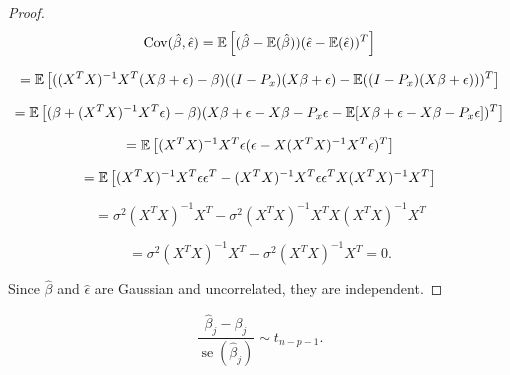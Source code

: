 \begin{proof}

\[
\mathrm{Cov}(\hat{\beta}, \hat{\epsilon}) = \mathbb{E} \left[ ( \hat{\beta} - \mathbb{E} (\hat{\beta})) ( \hat{\epsilon} - \mathbb{E} (\hat{\epsilon}))^T \right] 
\]

\[
= \mathbb{E} \left[ (  (X^TX)^{-1}X^T(X \beta + \epsilon) - \beta ) ( (I - P_x)(X \beta + \epsilon)  - \mathbb{E} (  (I - P_x)(X \beta + \epsilon) ))^T \right]
\]

\[
= \mathbb{E} \left[ (  \beta + (X^TX)^{-1}X^T \epsilon) - \beta ) (  X \beta + \epsilon - X \beta - P_x \epsilon  - \mathbb{E} [  X \beta + \epsilon - X \beta - P_x \epsilon] )^T \right]
\]

\[
= \mathbb{E} \left[   (X^TX)^{-1}X^T \epsilon (  \epsilon  - X (X^TX)^{-1} X^T \epsilon  )^T \right]
\]

\[
= \mathbb{E} \left[   (X^TX)^{-1}X^T \epsilon  \epsilon^T   - (X^TX)^{-1}X^T \epsilon  \epsilon^T X (X^TX)^{-1} X^T   \right]
\]

\[
= \sigma^2  (X^TX)^{-1}X^T   -  \sigma^2 (X^TX)^{-1}X^TX (X^TX)^{-1} X^T   
\]

\[
= \sigma^2  (X^TX)^{-1}X^T   -  \sigma^2  (X^TX)^{-1} X^T   = 0.
\]

Since \(\hat{\beta}\) and \(\hat{\epsilon}\) are Gaussian and uncorrelated, they are independent.

\end{proof}

\begin{proposition}\label{linreg.dist.beta.t}

\[
\frac{\hat{\beta}_j - \beta_j}{\operatorname{se}(\hat{\beta}_j)} \sim t_{n-p-1}. 
\]

\end{proposition}

